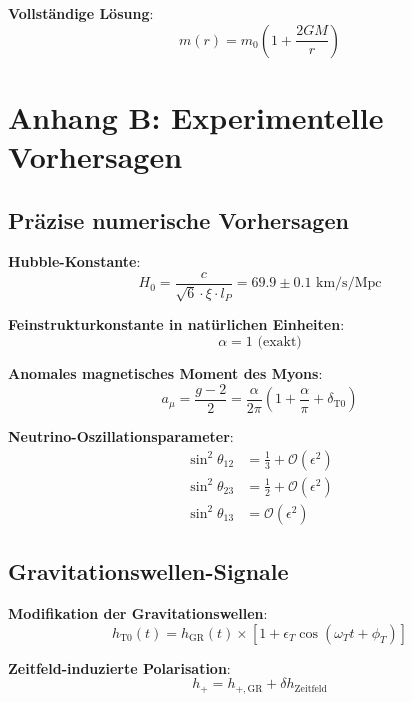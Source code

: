 \documentclass[12pt,a4paper]{report}
\begin{document}
	\textbf{Vollständige Lösung}:
	\begin{equation}
		m(r) = m_0\left(1 + \frac{2GM}{r}\right)
	\end{equation}
	
	\section{Anhang B: Experimentelle Vorhersagen}
	
	\subsection{Präzise numerische Vorhersagen}
	
	\textbf{Hubble-Konstante}:
	\begin{equation}
		H_0 = \frac{c}{\sqrt{6} \cdot \xi \cdot l_P} = 69.9 \pm 0.1 \text{ km/s/Mpc}
	\end{equation}
	
	\textbf{Feinstrukturkonstante in natürlichen Einheiten}:
	\begin{equation}
		\alpha = 1 \text{ (exakt)}
	\end{equation}
	
	\textbf{Anomales magnetisches Moment des Myons}:
	\begin{equation}
		a_\mu = \frac{g-2}{2} = \frac{\alpha}{2\pi}\left(1 + \frac{\alpha}{\pi} + \delta_{\text{T0}}\right)
	\end{equation}
	
	\textbf{Neutrino-Oszillationsparameter}:
	\begin{align}
		\sin^2\theta_{12} &= \frac{1}{3} + \mathcal{O}(\epsilon^2) \\
		\sin^2\theta_{23} &= \frac{1}{2} + \mathcal{O}(\epsilon^2) \\
		\sin^2\theta_{13} &= \mathcal{O}(\epsilon^2)
	\end{align}
	
	\subsection{Gravitationswellen-Signale}
	
	\textbf{Modifikation der Gravitationswellen}:
	\begin{equation}
		h_{\text{T0}}(t) = h_{\text{GR}}(t) \times \left[1 + \epsilon_T \cos(\omega_T t + \phi_T)\right]
	\end{equation}
	
	\textbf{Zeitfeld-induzierte Polarisation}:
	\begin{equation}
		h_+ = h_{+,\text{GR}} + \delta h_{\text{Zeitfeld}}
	\end{equation}
	
\end{document}
